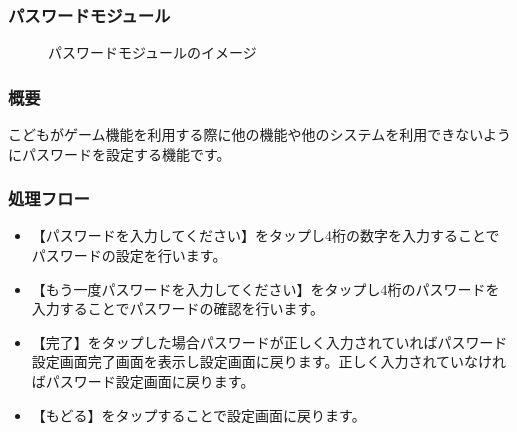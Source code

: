 \documentclass[a4j]{jarticle}
\begin{document}
\subsubsection{パスワードモジュール\label{パスワード}} %
\begin{figure}[H]
    \begin{center}
    \caption {パスワードモジュールのイメージ}
    \label{functionselection}
    \end{center}
\end{figure}
\subsubsection*{概要}
こどもがゲーム機能を利用する際に他の機能や他のシステムを利用できないようにパスワードを設定する機能です。
\subsubsection*{処理フロー}
\begin{itemize}
\item 【パスワードを入力してください】をタップし4桁の数字を入力することでパスワードの設定を行います。
\item【もう一度パスワードを入力してください】をタップし4桁のパスワードを入力することでパスワードの確認を行います。
\item 【完了】をタップした場合パスワードが正しく入力されていればパスワード設定画面完了画面を表示し設定画面に戻ります。正しく入力されていなければパスワード設定画面に戻ります。
\item 【もどる】をタップすることで設定画面に戻ります。
\end{itemize}
\end{document}
